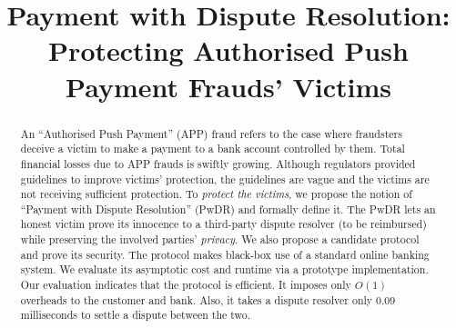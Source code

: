 \documentclass[orivec]{llncs}
\begin{document}
\title{Payment with Dispute Resolution: \\Protecting Authorised Push Payment Frauds' Victims}
\author{}
\institute{}

\date{}
\maketitle{}


\begin{abstract}
An ``Authorised Push Payment'' (APP) fraud refers to the case where  fraudsters deceive a victim  to make  a payment  to a bank account controlled by them.  Total financial losses due to  APP frauds is swiftly growing. Although  regulators   provided guidelines to  improve victims’ protection, the guidelines are  vague and  the victims are not receiving sufficient protection. To \emph{protect the  victims},  we propose the notion of ``Payment with Dispute Resolution'' (PwDR) and formally define it. The PwDR lets an honest victim  prove its innocence to a third-party dispute resolver  (to be reimbursed) while preserving the involved parties' \emph{privacy}. We also propose a  candidate protocol  and  prove its security. The protocol  makes black-box use of a standard online banking system. We evaluate its    asymptotic cost and   runtime  via a prototype implementation. Our evaluation indicates that the protocol is  efficient. It imposes only $O(1)$ overheads to the customer and bank.  Also, it takes  a dispute resolver  only $0.09$ milliseconds to  settle a dispute between the two.
\end{abstract}












\appendix






\end{document}
